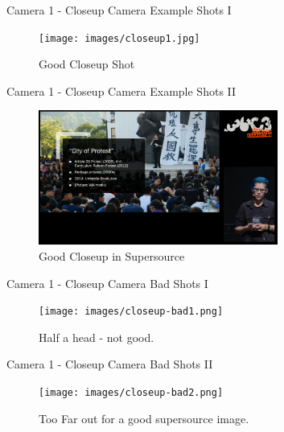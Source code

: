 \documentclass[aspectratio=169]{beamer}
\begin{document}
\begin{frame}{Camera 1 - Closeup Camera}
	Example Shots I
	\begin{figure} 
		\centering
		\texttt{[image: images/closeup1.jpg]}
		\caption{Good Closeup Shot}
	\end{figure}
\end{frame}

\begin{frame}{Camera 1 - Closeup Camera}
	Example Shots II
	\begin{figure} 
		\centering
		\includegraphics[width=0.7\textwidth]{images/closeup2.jpg}
		\caption{Good Closeup in Supersource}
	\end{figure}
\end{frame}

\begin{frame}{Camera 1 - Closeup Camera}
	Bad Shots I
	\begin{figure} 
		\centering
		\texttt{[image: images/closeup-bad1.png]}
		\caption{Half a head - not good.}
	\end{figure}
\end{frame}

\begin{frame}{Camera 1 - Closeup Camera}
	Bad Shots II
	\begin{figure} 
		\centering
		\texttt{[image: images/closeup-bad2.png]}
		\caption{Too Far out for a good supersource image.}
	\end{figure}
\end{frame}
\end{document}
